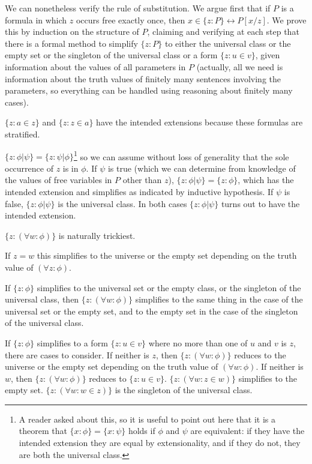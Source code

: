 \documentclass[12pt]{article}
\begin{document}
We can nonetheless verify the rule of substitution.  We argue first that if $P$ is a formula in which $z$ occurs free exactly once,
then $x \in \{z:P\} \leftrightarrow P[x/z]$.  We prove this by induction on the structure of $P$, claiming and verifying at each step that there is a formal method to simplify $\{z:P\}$ to either the universal class or the empty set or the singleton of the universal class or a form $\{z:u \in v\}$, given information about the values of all parameters in $P$ (actually, all we need is information about the truth values of finitely  many sentences involving the parameters, so everything can be handled using reasoning about finitely many cases).  

$\{z:a \in z\}$ and
$\{z:z \in a\}$ have the intended extensions because these formulas are stratified.  

$\{z:\phi|\psi\} = \{z:\psi|\phi\}$\footnote{A reader asked about this, so it is useful to point out here that it is a theorem that $\{x:\phi\} = \{x:\psi\}$ holds if $\phi$ and $\psi$ are equivalent:  if they have the intended extension they are equal by extensionality, and if they do not, they are both the universal class.}  so we can assume without loss of generality that the sole occurrence of $z$ is in $\phi$.  If $\psi$ is true (which we can determine from knowledge of the values of free variables in $P$ other than $z$), $\{z:\phi|\psi\} =\{z:\phi\}$, which has the intended extension and simplifies as indicated by inductive hypothesis.  If $\psi$ is false, $\{z:\phi|\psi\}$ is the universal class.  In both cases $\{z:\phi|\psi\}$ turns out to have the intended extension.  

$\{z:(\forall w:\phi)\}$ is naturally trickiest.  

If $z=w$ this simplifies to the universe or the empty set depending on the truth value of $(\forall z:\phi)$.  

If $\{z:\phi\}$ simplifies to the universal set or the empty class, or the singleton of the universal class, then  $\{z:(\forall w:\phi)\}$ simplifies to the same thing in the case of the universal set or the empty set, and to the empty set in the case of the singleton of the universal class.   

If $\{z:\phi\}$ simplifies to a form $\{z:u \in v\}$ where no more than one of $u$ and $v$ is $z$, there are cases to consider.  If neither is $z$, then
$\{z:(\forall w:\phi)\}$ reduces to the universe or the empty set depending on the truth value of $(\forall w:\phi)$.  If neither is $w$,  then
$\{z:(\forall w:\phi)\}$ reduces to $\{z:u \in v\}$.  $\{z:(\forall w:z \in w)\}$ simplifies to the empty set.  $\{z:(\forall w:w \in z)\}$ is the singleton of the universal class.
\end{document}
